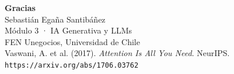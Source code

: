 \documentclass[aspectratio=169, 10pt]{beamer}
\begin{document}

\begin{frame}[plain]
  \begin{center}
    \vspace{2em}
    {\Large \textbf{Gracias}}\\[1em]
    {\normalsize Sebastián Egaña Santibáñez}\\[0.3em]
    {\small Módulo 3 · IA Generativa y LLMs}\\
    {\small FEN Unegocios, Universidad de Chile}\\[1.5em]
    \textcolor{fengray}{\small Vaswani, A. et al. (2017). \textit{Attention Is All You Need}. NeurIPS.}\\
    \textcolor{fengray}{\small \texttt{https://arxiv.org/abs/1706.03762}}
  \end{center}
\end{frame}

\end{document}
